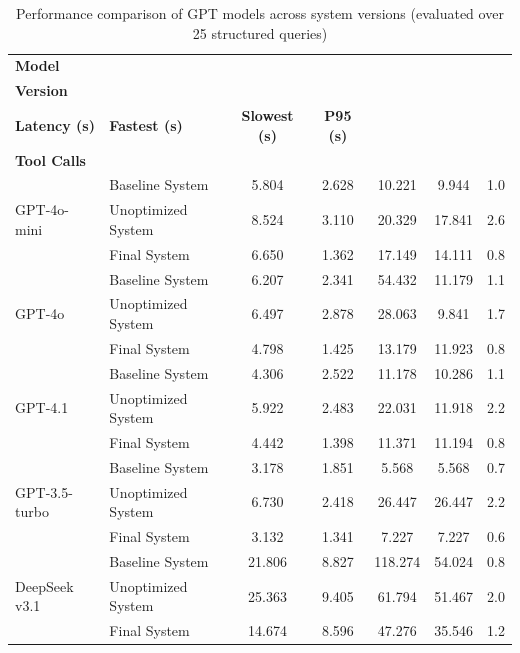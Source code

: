 \documentclass[final-report]{report-template}
\begin{document}
\begin{table}[t]
\centering
\begin{tabularx}{\textwidth}{l X c c c c c}
\toprule
\textbf{Model} & \makecell[l]{\textbf{System}\\\textbf{Version}} & \makecell[c]{\textbf{Avg}\\\textbf{Latency (s)}} & \textbf{Fastest (s)} & \textbf{Slowest (s)} & \textbf{P95 (s)} & \makecell[c]{\textbf{Avg}\\\textbf{Tool Calls}} \\
\midrule

\multirow{3}{*}{GPT-4o-mini}
& Baseline System    & 5.804  & 2.628 & 10.221  & 9.944   & 1.0 \\
& Unoptimized System & 8.524  & 3.110 & 20.329  & 17.841  & 2.6 \\
& Final System       & 6.650  & 1.362 & 17.149  & 14.111  & 0.8 \\

\midrule
\multirow{3}{*}{GPT-4o}
& Baseline System    & 6.207  & 2.341 & 54.432  & 11.179  & 1.1 \\
& Unoptimized System & 6.497  & 2.878 & 28.063  & 9.841   & 1.7 \\
& Final System       & 4.798  & 1.425 & 13.179  & 11.923  & 0.8 \\

\midrule
\multirow{3}{*}{GPT-4.1}
& Baseline System    & 4.306  & 2.522 & 11.178  & 10.286  & 1.1 \\
& Unoptimized System & 5.922  & 2.483 & 22.031  & 11.918  & 2.2 \\
& Final System       & 4.442  & 1.398 & 11.371  & 11.194  & 0.8 \\

\midrule
\multirow{3}{*}{GPT-3.5-turbo}
& Baseline System    & 3.178  & 1.851 & 5.568   & 5.568   & 0.7 \\
& Unoptimized System & 6.730  & 2.418 & 26.447  & 26.447  & 2.2 \\
& Final System       & 3.132  & 1.341 & 7.227   & 7.227   & 0.6 \\

\midrule
\multirow{3}{*}{DeepSeek v3.1}
& Baseline System    & 21.806 & 8.827 & 118.274 & 54.024  & 0.8 \\
& Unoptimized System & 25.363 & 9.405 & 61.794  & 51.467  & 2.0 \\
& Final System       & 14.674 & 8.596 & 47.276  & 35.546  & 1.2 \\

\bottomrule
\end{tabularx}
\caption{Performance comparison of GPT models across system versions (evaluated over 25 structured queries)}
\label{tab:models-clients-performance}
\end{table}
\end{document}
